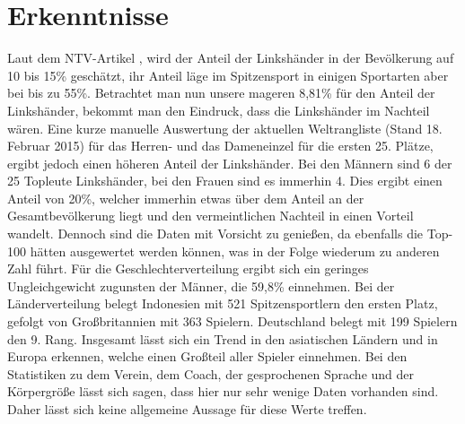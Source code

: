 \documentclass[12pt,a4paper]{article}
\begin{document}
\section{Erkenntnisse}
\label{Erkenntnisse}
Laut dem NTV-Artikel \cite{Hand2015}, wird der Anteil der Linkshänder in der Bevölkerung auf 10 bis 15\% geschätzt, ihr Anteil läge im Spitzensport in einigen Sportarten aber bei bis zu 55\%. Betrachtet man nun unsere mageren 8,81\% für den Anteil der Linkshänder, bekommt man den Eindruck, dass die Linkshänder im Nachteil wären. Eine kurze manuelle Auswertung der aktuellen Weltrangliste (Stand 18. Februar 2015) für das Herren- und das Dameneinzel für die ersten 25. Plätze, ergibt jedoch einen höheren Anteil der Linkshänder. Bei den Männern sind 6 der 25 Topleute Linkshänder, bei den Frauen sind es immerhin 4. Dies ergibt einen Anteil von 20\%, welcher immerhin etwas über dem Anteil an der Gesamtbevölkerung liegt und den vermeintlichen Nachteil in einen Vorteil wandelt. Dennoch sind die Daten mit Vorsicht zu genießen, da ebenfalls die Top-100 hätten ausgewertet werden können, was in der Folge wiederum zu anderen Zahl führt.
\newline
Für die Geschlechterverteilung ergibt sich ein geringes Ungleichgewicht zugunsten der Männer, die 59,8\% einnehmen. Bei der Länderverteilung belegt Indonesien mit 521 Spitzensportlern den ersten Platz, gefolgt von Großbritannien mit 363 Spielern. Deutschland belegt mit 199 Spielern den 9. Rang. Insgesamt lässt sich ein Trend in den asiatischen Ländern und in Europa erkennen, welche einen Großteil aller Spieler einnehmen.
\newline\newline
Bei den Statistiken zu dem Verein, dem Coach, der gesprochenen Sprache und der Körpergröße lässt sich sagen, dass hier nur sehr wenige Daten vorhanden sind. Daher lässt sich keine allgemeine Aussage für diese Werte treffen.
\end{document}
